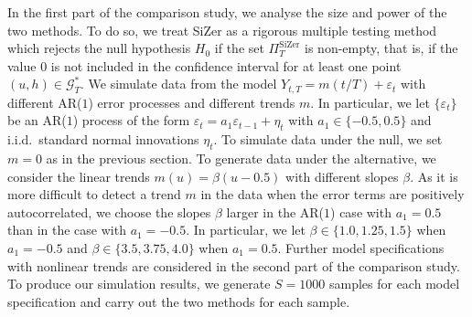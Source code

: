 In the first part of the comparison study, we analyse the size and power of the two methods. To do so, we treat SiZer as a rigorous multiple testing method which rejects the null hypothesis $H_0$ if the set $\Pi_T^{\text{SiZer}}$ is non-empty, that is, if the value $0$ is not included in the confidence interval for at least one point $(u,h) \in \mathcal{G}_T^*$. We simulate data from the model $Y_{t,T} = m(t/T) + \varepsilon_t$ with different AR($1$) error processes and different trends $m$. In particular, we let $\{\varepsilon_t\}$ be an AR($1$) process of the form $\varepsilon_t = a_1 \varepsilon_{t-1} + \eta_t$ with $a_1 \in \{ -0.5,0.5\}$ and i.i.d.\ standard normal innovations $\eta_t$. To simulate data under the null, we set $m = 0$ as in the previous section. To generate data under the alternative, we consider the linear trends $m(u) = \beta (u - 0.5)$ with different slopes $\beta$. As it is more difficult to detect a trend $m$ in the data when the error terms are positively autocorrelated, we choose the slopes $\beta$ larger in the AR($1$) case with $a_1 = 0.5$ than in the case with $a_1 = -0.5$. In particular, we let $\beta \in \{ 1.0,1.25,1.5 \}$ when $a_1 = -0.5$ and $\beta \in \{ 3.5, 3.75, 4.0 \}$ when $a_1 = 0.5$. Further model specifications with nonlinear trends are considered in the second part of the comparison study. To produce our simulation results, we generate $S=1000$ samples for each model specification and carry out the two methods for each sample. 


